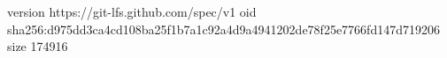 version https://git-lfs.github.com/spec/v1
oid sha256:d975dd3ca4cd108ba25f1b7a1c92a4d9a4941202de78f25e7766fd147d719206
size 174916
